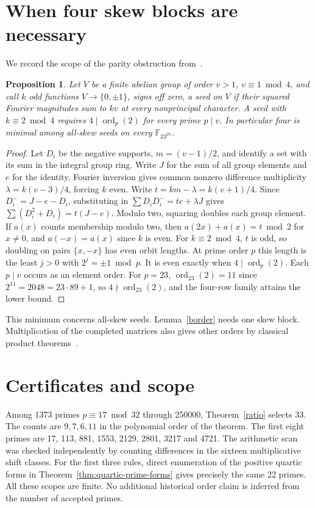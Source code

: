 \documentclass[11pt]{article}
\newtheorem{proposition}[theorem]{Proposition}
\newcommand{\F}{\mathbb F}
\begin{document}
\section{When four skew blocks are necessary}
We record the scope of the parity obstruction from~\cite{Kline}.
\begin{proposition}
Let $V$ be a finite abelian group of order $v>1$, $v\equiv1\bmod4$, and call $k$ odd functions $V\to\{0,\pm1\}$, signs off zero, a seed on $V$ if their squared Fourier magnitudes sum to $kv$ at every nonprincipal character. A seed with $k\equiv2\bmod4$ requires $4\mid\operatorname{ord}_p(2)$ for every prime $p\mid v$. In particular four is minimal among all-skew seeds on every $\F_{23^{2n}}$.
\end{proposition}
\begin{proof}
Let $D_i$ be the negative supports, $m=(v-1)/2$, and identify a set with its sum in the integral group ring. Write $J$ for the sum of all group elements and $e$ for the identity. Fourier inversion gives common nonzero difference multiplicity $\lambda=k(v-3)/4$, forcing $k$ even. Write $t=km-\lambda=k(v+1)/4$. Since $D_i^-=J-e-D_i$, substituting in $\sum D_iD_i^-=te+\lambda J$ gives $\sum(D_i^2+D_i)=t(J-e)$. Modulo two, squaring doubles each group element. If $a(x)$ counts membership modulo two, then $a(2x)+a(x)=t\bmod2$ for $x\ne0$, and $a(-x)=a(x)$ since $k$ is even. For $k\equiv2\bmod4$, $t$ is odd, so doubling on pairs $\{x,-x\}$ has even orbit lengths. At prime order $p$ this length is the least $j>0$ with $2^j=\pm1\bmod p$. It is even exactly when $4\mid\operatorname{ord}_p(2)$. Each $p\mid v$ occurs as an element order. For $p=23$, $\operatorname{ord}_{23}(2)=11$ since $2^{11}=2048=23\cdot89+1$, so $4\nmid\operatorname{ord}_{23}(2)$, and the four-row family attains the lower bound.
\end{proof}
This minimum concerns all-skew seeds. Lemma~\ref{border} needs one skew block. Multiplication of the completed matrices also gives other orders by classical product theorems~\cite{CP}.

\section*{Certificates and scope}
Among 1373 primes $p\equiv17\bmod32$ through 250000, Theorem~\ref{ratio} selects 33. The counts are $9,7,6,11$ in the polynomial order of the theorem. The first eight primes are 17, 113, 881, 1553, 2129, 2801, 3217 and 4721. The arithmetic scan was checked independently by counting differences in the sixteen multiplicative shift classes. For the first three rules, direct enumeration of the positive quartic forms in Theorem~\ref{thm:quartic-prime-forms} gives precisely the same 22 primes. All these scopes are finite. No additional historical order claim is inferred from the number of accepted primes.
\end{document}
